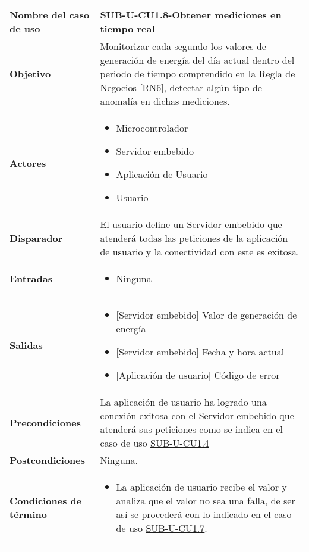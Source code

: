 \begin{longtable}{|J{5cm}|J{10.3cm}|}
	\hline
	\textbf{Nombre del caso de uso} &
		SUB-U-CU1.8-Obtener mediciones en tiempo real \\ \hline
	\textbf{Objetivo} &
		Monitorizar cada segundo los valores de generación de energía del día actual dentro del periodo de tiempo comprendido en la Regla de Negocios \ref{RN6}, detectar algún tipo de anomalía en dichas mediciones. \\ \hline
	\textbf{Actores} &
		\begin{itemize}
		    \item Microcontrolador
			\item Servidor embebido
			\item Aplicación de Usuario
		    \item Usuario
		\end{itemize} \\ \hline
	\textbf{Disparador} & 
	    El usuario define un Servidor embebido que atenderá todas las peticiones de la aplicación de usuario y la conectividad con este es exitosa.\\ \hline 
	\textbf{Entradas} & 
		\begin{itemize}
				\item Ninguna
		\end{itemize}\\ \hline 
	\textbf{Salidas} & 
		\begin{itemize}
			\item{[Servidor embebido]} Valor de generación de energía
			\item{[Servidor embebido]} Fecha y hora actual
			\item{[Aplicación de usuario]} Código de error
		\end{itemize} \\ \hline
	\textbf{Precondiciones} &
		La aplicación de usuario ha logrado una conexión exitosa con el Servidor embebido que atenderá sus peticiones como se indica en el caso de uso \hyperref[SUB-U-CU1.4]{SUB-U-CU1.4} \\ \hline
	\textbf{Postcondiciones} &
		Ninguna.\\ \hline
	\textbf{Condiciones de término} & 
		\begin{itemize}
			\item La aplicación de usuario recibe el valor y analiza que el valor no sea una falla, de ser así se procederá con lo indicado en el caso de uso \hyperref[SUB-U-CU1.7]{SUB-U-CU1.7}.
		\end{itemize} \\ \hline 

\end{longtable}

